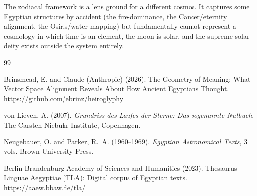 \documentclass[11pt, a4paper]{article}
\begin{document}
The zodiacal framework is a lens ground for a different cosmos. It captures some Egyptian structures by accident (the fire-dominance, the Cancer/eternity alignment, the Osiris/water mapping) but fundamentally cannot represent a cosmology in which time is an element, the moon is solar, and the supreme solar deity exists outside the system entirely.


\begin{thebibliography}{99}

Brinsmead, E. and Claude (Anthropic) (2026).
\newblock The Geometry of Meaning: What Vector Space Alignment Reveals About How Ancient Egyptians Thought.
\newblock \url{https://github.com/ebrinz/heiroglyphy}

von Lieven, A. (2007).
\newblock \textit{Grundriss des Laufes der Sterne: Das sogenannte Nutbuch}.
\newblock The Carsten Niebuhr Institute, Copenhagen.

Neugebauer, O. and Parker, R.~A. (1960--1969).
\newblock \textit{Egyptian Astronomical Texts}, 3 vols.
\newblock Brown University Press.

Berlin-Brandenburg Academy of Sciences and Humanities (2023).
\newblock Thesaurus Linguae Aegyptiae (TLA): Digital corpus of Egyptian texts.
\newblock \url{https://aaew.bbaw.de/tla/}

\end{thebibliography}
\end{document}
